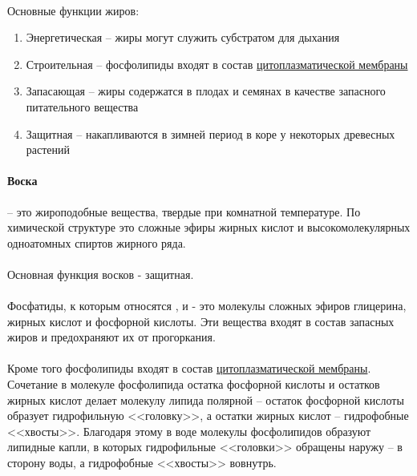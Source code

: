 \paragraph*{}Основные функции жиров:

\begin{enumerate}

	\item Энергетическая -- жиры могут служить субстратом для дыхания
	\item Строительная -- фосфолипиды входят в состав \hyperlink{plasmolema}{цитоплазматической мембраны}
	\item Запасающая -- жиры содержатся в плодах и семянах в качестве запасного питательного вещества
	\item Защитная -- накапливаются в зимней период в коре у некоторых древесных растений \cite{zauralov_1995}
\end{enumerate}

\paragraph*{Воска} -- это жироподобные вещества, твердые при комнатной температуре. По химической структуре это сложные эфиры жирных кислот и высокомолекулярных одноатомных спиртов жирного ряда.

\paragraph*{}Основная функция восков - защитная.

\paragraph*{}Фосфатиды, к которым относятся ,  и  - это молекулы сложных эфиров глицерина, жирных кислот и фосфорной кислоты. Эти вещества входят в состав запасных жиров и предохраняют их от прогоркания.

\paragraph*{}Кроме того \hypertarget{plipids}{фосфолипиды} входят в состав \hyperlink{plasmolema}{цитоплазматической мембраны}. Сочетание в молекуле фосфолипида остатка фосфорной кислоты и остатков жирных кислот делает молекулу липида полярной -- остаток фосфорной кислоты образует гидрофильную <<головку>>, а остатки жирных кислот -- гидрофобные <<хвосты>>. Благодаря этому в воде молекулы фосфолипидов образуют липидные капли, в которых гидрофильные <<головки>> обращены наружу -- в сторону воды, а гидрофобные <<хвосты>> вовнутрь.

